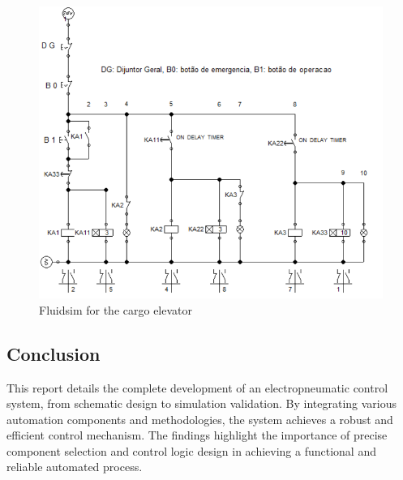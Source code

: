 \begin{figure}[H]
    \includegraphics[width=16cm]{Images/Q5/fluidsim.png}
    \centering
    \caption{Fluidsim for the cargo elevator}
    \label{fig:fluidsim}
\end{figure}

\subsection{Conclusion}

This report details the complete development of an electropneumatic control system, from schematic 
design to simulation validation. By integrating various automation components and methodologies, 
the system achieves a robust and efficient control mechanism. The findings highlight the importance 
of precise component selection and control logic design in achieving a functional and reliable 
automated process.